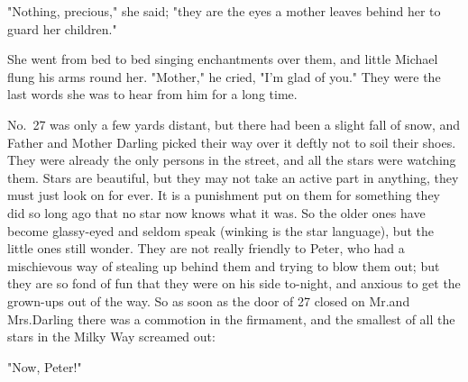 "Nothing, precious," she said;
"they are the eyes a mother leaves behind her to guard her children."

She went from bed to bed singing enchantments over them, and little Michael flung his arms round her.
"Mother," he cried, "I'm glad of you."
They were the last words she was to hear from him for a long time.

No.~27 was only a few yards distant, but there had been a slight fall of snow, and Father and Mother Darling picked their way over it deftly not to soil their shoes.
They were already the only persons in the street, and all the stars were watching them.
Stars are beautiful, but they may not take an active part in anything, they must just look on for ever.
It is a punishment put on them for something they did so long ago that no star now knows what it was.
So the older ones have become glassy-eyed and seldom speak (winking is the star language), but the little ones still wonder.
They are not really friendly to Peter, who had a mischievous way of stealing up behind them and trying to blow them out;
but they are so fond of fun that they were on his side to-night, and anxious to get the grown-ups out of the way.
So as soon as the door of 27 closed on Mr.\@ and Mrs.\@ Darling there was a commotion in the firmament, and the smallest of all the stars in the Milky Way screamed out:

"Now, Peter!"

